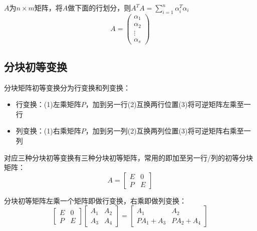 \begin{theorem}[$A^TA$的和式表达]
  $A$为$n \times m$矩阵，将$A$做下面的行划分，则$A^TA = \sum\limits_{i = 1}^n \alpha_i^T \alpha_i$
  \begin{equation*}
    A = \left(
      \begin{array}{c}
        \alpha_1\\
        \alpha_2\\
        \vdots\\
        \alpha_s
      \end{array}
    \right)
  \end{equation*}
\end{theorem}


\subsection{分块初等变换}

\begin{definition}[分块矩阵初等变换]
  分块矩阵初等变换分为行变换和列变换：
  \begin{itemize}
  \item 行变换：(1)左乘矩阵$P$，加到另一行(2)互换两行位置(3)将可逆矩阵左乘至一行
  \item 列变换：(1)右乘矩阵$P$，加到另一列(2)互换两列位置(3)将可逆矩阵右乘至一列
  \end{itemize}
\end{definition}

\begin{definition}[分块初等矩阵]
  对应三种分块初等变换有三种分块初等矩阵，常用的即加至另一行/列的初等分块矩阵：
  \begin{equation*}
    A = \left[
      \begin{array}{cc}
        E&0\\
        P&E
      \end{array}
    \right]
  \end{equation*}
\end{definition}

\begin{theorem}[初等变换的分块初等矩阵表达]
  分块初等矩阵左乘一个矩阵即做行变换，右乘即做列变换：
  \begin{equation*}
    \left[
      \begin{array}{cc}
        E&0\\
        P&E
      \end{array}
    \right] \left[
      \begin{array}{cc}
        A_1&A_2\\
        A_3&A_4
      \end{array}
    \right] = \left[
      \begin{array}{cc}
        A_1&A_2\\
        PA_1 + A_3& PA_2 + A_4
      \end{array}
    \right]
  \end{equation*}
\end{theorem}


